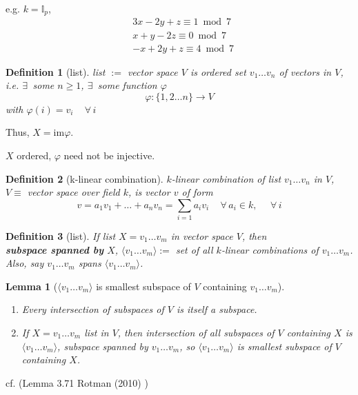 \documentclass[10pt]{amsart}
\newtheorem{lemma}{Lemma}
\newtheorem{definition}{Definition}
\begin{document}
\begin{multicols*}{2}
e.g. $k = \mathbb{I}_p$, 
\[
\begin{aligned}
& 3x - 2y + z \equiv 1 \bmod{7} \\
& x + y -2 z \equiv 0 \bmod{7} \\
& -x + 2y + z \equiv 4 \bmod{7}
\end{aligned}
\]
\begin{definition}[list]
	list $:=$ vector space $V$ is ordered set $v_1 \dots v_n$ of vectors in $V$, i.e. 
	$\exists \, $ some $n\geq 1$, $\exists \, $ some function $\varphi$ 
	\[
	\varphi : \lbrace 1,2\dots n \rbrace \to V
	\]
	with $\varphi(i) = v_i \quad \, \forall \, i$
\end{definition}

Thus, $X = \text{im}\varphi$.

$X$ ordered, $\varphi$ need not be injective. 

\begin{definition}[k-linear combination]
	$k$-linear combination of list $v_1\dots v_n$ in $V$, $V\equiv $ vector space over field $k$, is vector $v$ of form 
	\[
	v = a_1 v_1 + \dots + a_n v_n  = \sum_{i=1} a_i v_i \quad \, \forall \, a_i \in k, \, \quad \, \forall \, i
	\]
\end{definition}

\begin{definition}[list]
	If list $X = v_1 \dots v_m$ in vector space $V$, then \\
	\textbf{subspace spanned by } $X$, $\langle v_1 \dots v_m \rangle := $ set of all $k$-linear combinations of $v_1 \dots v_m$.  Also, say $v_1 \dots v_m $ spans $\langle v_1 \dots v_m\rangle$. 
\end{definition}

\begin{lemma}[$\langle v_1 \dots v_m \rangle$ is smallest subspace of $V$ containing $v_1\dots v_m$]\label{Lemma:smallest_subspace}
\begin{enumerate}
	\item[(i)] Every intersection of subspaces of $V$ is itself a subspace.
	\item[(ii)] If $X= v_1 \dots v_m$ list in $V$, then intersection of all subspaces of $V$ containing $X$ is $\langle v_1 \dots v_m \rangle$, subspace spanned by $v_1\dots v_m$, so $\langle v_1 \dots v_m \rangle$ is smallest subspace of $V$ containing $X$. 
\end{enumerate}
\end{lemma}
cf. (Lemma 3.71 Rotman (2010) \cite{JRotman2010}) 


\end{multicols*}
\end{document}
